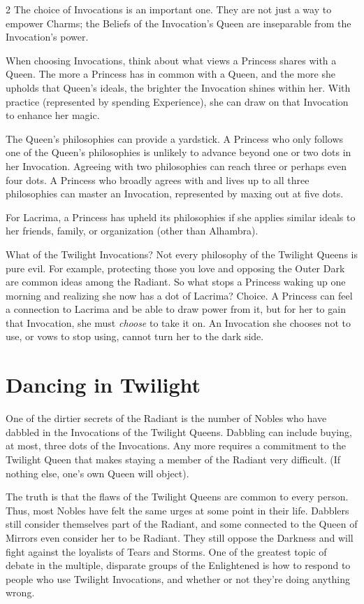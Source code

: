 \begin{multicols}{2}
The choice of Invocations is an important one. They are not just a way to empower Charms; the Beliefs of the Invocation's Queen are inseparable from the Invocation's power.  

When choosing Invocations, think about what views a Princess shares with a Queen. The more a Princess has in common with a Queen, and the more she upholds that Queen's ideals, the brighter the Invocation shines within her. With practice (represented by spending Experience), she can draw on that Invocation to enhance her magic. 

The Queen's philosophies can provide a yardstick. A Princess who only follows one of the Queen's philosophies is unlikely to advance beyond one or two dots in her Invocation. Agreeing with two philosophies can reach three or perhaps even four dots. A Princess who broadly agrees with and lives up to all three philosophies can master an Invocation, represented by maxing out at five dots.

For Lacrima, a Princess has upheld its philosophies if she applies similar ideals to her friends, family, or organization (other than Alhambra).

What of the Twilight Invocations? Not every philosophy of the Twilight Queens is pure evil. For example, protecting those you love and opposing the Outer Dark are common ideas among the Radiant. So what stops a Princess waking up one morning and realizing she now has a dot of Lacrima? Choice. A Princess can feel a connection to Lacrima and be able to draw power from it, but for her to gain that Invocation, she must \textit{choose} to take it on. An Invocation she chooses not to use, or vows to stop using, cannot turn her to the dark side. 


\bigsidebarstart
\section*{Dancing in Twilight}

One of the dirtier secrets of the Radiant is the number of Nobles who have dabbled in the Invocations of the Twilight Queens. Dabbling can include buying, at most, three dots of the Invocations. Any more requires a commitment to the Twilight Queen that makes staying a member of the Radiant very difficult. (If nothing else, one's own Queen will object). 

The truth is that the flaws of the Twilight Queens are common to every person. Thus, most Nobles have felt the same urges at some point in their life. Dabblers still consider themselves part of the Radiant, and some connected to the Queen of Mirrors even consider her to be Radiant. They still oppose the Darkness and will fight against the loyalists of Tears and Storms. One of the greatest topic of debate in the multiple, disparate groups of the Enlightened is how to respond to people who use Twilight Invocations, and whether or not they're doing anything wrong.


\end{multicols}
